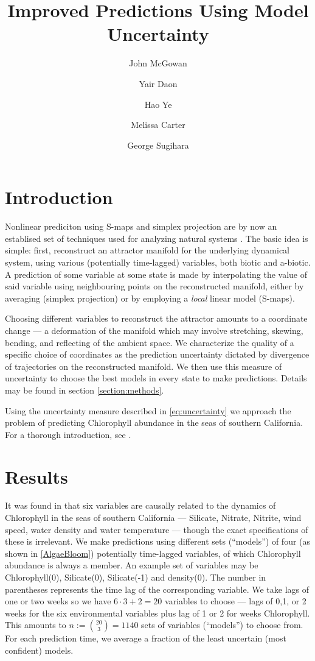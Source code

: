 \documentclass[fleqn,10pt]{wlscirep}
\title{Improved Predictions Using Model Uncertainty}
\author[2]{John McGowan}
\author[1,*]{Yair Daon}
\author[2]{Hao Ye}
\author[2]{Melissa Carter}
\author[2]{George Sugihara}
\affil[1]{NYU, Courant Institute of Mathematical Sciences, New York, NY 10012 USA}
\affil[2]{University of California San Diego, Scripps Institution of Oceanography, La Jolla, CA 92037, USA}
\affil[*]{yair.daon@gmail.com}
\affil[+]{these authors contributed equally to this work}
\begin{document}
\flushbottom
\maketitle

\thispagestyle{empty}

\section{Introduction}
Nonlinear prediciton using S-maps \cite{Smaps} and simplex projection
\cite{simplex} are by now an establised set of techniques used for
analyzing natural systems \cite{Salmon,Influenza,Neurons}. The basic
idea is simple: first, reconstruct an attractor manifold for the
underlying dynamical system, using various (potentially time-lagged)
variables, both biotic and a-biotic. A prediction of some variable at
some state is made by interpolating the value of said variable using
neighbouring points on the reconstructed manifold, either by averaging
(simplex projection) or by employing a \emph{local} linear model
(S-maps).

Choosing different variables to reconstruct the attractor amounts to a
coordinate change --- a deformation of the manifold which may involve
stretching, skewing, bending, and reflecting of the ambient space. We
characterize the quality of a specific choice of coordinates as the
prediction uncertainty dictated by divergence of trajectories on the
reconstructed manifold. We then use this measure of uncertainty to
choose the best models in every state to make predictions. Details may
be found in section \ref{section:methods}.

Using the uncertainty measure described in \eqref{eq:uncertainty} we
approach the problem of predicting Chlorophyll abundance in the seas
of southern California. For a thorough introduction, see
\cite{AlgaeBloom}.

\section{Results}\label{section:results}
 It was found in \cite{AlgaeBloom} that six variables are causally
 related to the dynamics of Chlorophyll in the seas of southern
 California --- Silicate, Nitrate, Nitrite, wind speed, water density
 and water temperature --- though the exact specifications of these is
 irrelevant. We make predictions using different sets (``models'') of
 four (as shown in \ref{AlgaeBloom}) potentially time-lagged
 variables, of which Chlorophyll abundance is always a member. An
 example set of variables may be Chlorophyll(0), Silicate(0),
 Silicate(-1) and density(0). The number in parentheses represents the
 time lag of the corresponding variable. We take lags of one or two
 weeks so we have $6 \cdot 3 + 2 = 20$ variables to choose --- lags of
 0,1, or 2 weeks for the six environmental variables plus lag of 1 or
 2 for weeks Chlorophyll. This amounts to $n := \binom{20}{3} = 1140$
 sets of variables (``models'') to choose from. For each prediction time, we
 average a fraction of the least uncertain (most confident) models.
\end{document}

